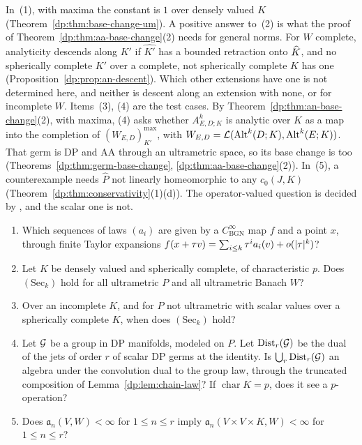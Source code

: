 In~(1), with maxima the constant is $1$ over densely valued $K$ (Theorem~\ref{dp:thm:base-change-um}). A positive answer to~(2) is what the proof of Theorem~\ref{dp:thm:aa-base-change}(2) needs for general norms. For $W$ complete, analyticity descends along $K'$ if $\widehat{K'}$ has a bounded retraction onto $\widehat K$, and no spherically complete $K'$ over a complete, not spherically complete $K$ has one (Proposition~\ref{dp:prop:an-descent}). Which other extensions have one is not determined here, and neither is descent along an extension with none, or for incomplete $W$. Items~(3), (4) are the test cases. By Theorem~\ref{dp:thm:an-base-change}(2), with maxima, (4) asks whether $A^k_{E,D;K}$ is analytic over $K$ as a map into the completion of $(W_{E,D})^{\max}_{K'}$, with $W_{E,D}=\mathcal L(\operatorname{Alt}^k(D;K),\operatorname{Alt}^k(E;K))$. That germ is DP and AA through an ultrametric space, so its base change is too (Theorems~\ref{dp:thm:germ-base-change}, \ref{dp:thm:aa-base-change}(2)). In~(5), a counterexample needs $\widehat P$ not linearly homeomorphic to any $c_0(J,K)$ (Theorem~\ref{dp:thm:conservativity}(1)(d)). The operator-valued question is decided by \cite[Theorem~7.2(2)]{I}, and the scalar one is not.

\begin{question}\label{dp:q:jets}
\leavevmode
\begin{enumerate}
\item Which sequences of laws $(a_i)$ are given by a $C^\infty_{\mathrm{BGN}}$ map $f$ and a point $x$, through finite Taylor expansions $f(x+\tau v)=\sum_{i\le k}\tau^ia_i(v)+o(\lvert \tau\rvert^k)$?
\item Let $K$ be densely valued and spherically complete, of characteristic $p$. Does $(\mathrm{Sec}_k)$ hold for all ultrametric $P$ and all ultrametric Banach $W$?
\item Over an incomplete $K$, and for $P$ not ultrametric with scalar values over a spherically complete $K$, when does $(\mathrm{Sec}_k)$ hold?
\item Let $\mathcal G$ be a group in DP manifolds, modeled on $P$. Let $\operatorname{Dist}_r(\mathcal G)$ be the dual of the jets of order $r$ of scalar DP germs at the identity. Is $\bigcup_r\operatorname{Dist}_r(\mathcal G)$ an algebra under the convolution dual to the group law, through the truncated composition of Lemma~\ref{dp:lem:chain-law}? If $\operatorname{char}K=p$, does it see a $p$\nobreakdash-operation?
\item Does $\mathfrak a_n(V,W)<\infty$ for $1\le n\le r$ imply $\mathfrak a_n(V\times V\times K,W)<\infty$ for $1\le n\le r$?
\end{enumerate}
\end{question}

